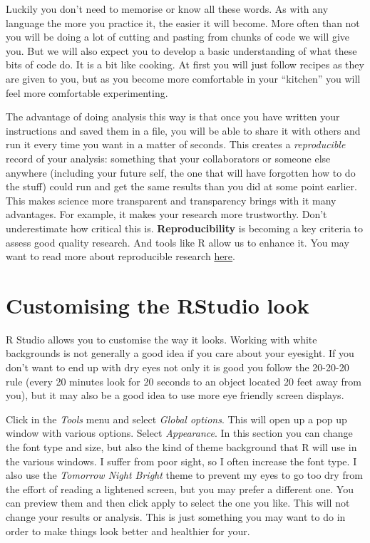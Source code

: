 \documentclass[]{book}
\begin{document}
Luckily you don't need to memorise or know all these words. As with any language the more you practice it, the easier it will become. More often than not you will be doing a lot of cutting and pasting from chunks of code we will give you. But we will also expect you to develop a basic understanding of what these bits of code do. It is a bit like cooking. At first you will just follow recipes as they are given to you, but as you become more comfortable in your ``kitchen'' you will feel more comfortable experimenting.

The advantage of doing analysis this way is that once you have written your instructions and saved them in a file, you will be able to share it with others and run it every time you want in a matter of seconds. This creates a \emph{reproducible} record of your analysis: something that your collaborators or someone else anywhere (including your future self, the one that will have forgotten how to do the stuff) could run and get the same results than you did at some point earlier. This makes science more transparent and transparency brings with it many advantages. For example, it makes your research more trustworthy. Don't underestimate how critical this is. \textbf{Reproducibility} is becoming a key criteria to assess good quality research. And tools like R allow us to enhance it. You may want to read more about reproducible research \href{http://theconversation.com/the-science-reproducibility-crisis-and-what-can-be-done-about-it-74198}{here}.

\hypertarget{customising-the-rstudio-look}{%
\section{Customising the RStudio look}\label{customising-the-rstudio-look}}

R Studio allows you to customise the way it looks. Working with white backgrounds is not generally a good idea if you care about your eyesight. If you don't want to end up with dry eyes not only it is good you follow the 20-20-20 rule (every 20 minutes look for 20 seconds to an object located 20 feet away from you), but it may also be a good idea to use more eye friendly screen displays.

Click in the \emph{Tools} menu and select \emph{Global options}. This will open up a pop up window with various options. Select \emph{Appearance}. In this section you can change the font type and size, but also the kind of theme background that R will use in the various windows. I suffer from poor sight, so I often increase the font type. I also use the \emph{Tomorrow Night Bright} theme to prevent my eyes to go too dry from the effort of reading a lightened screen, but you may prefer a different one. You can preview them and then click apply to select the one you like. This will not change your results or analysis. This is just something you may want to do in order to make things look better and healthier for your.
\end{document}

